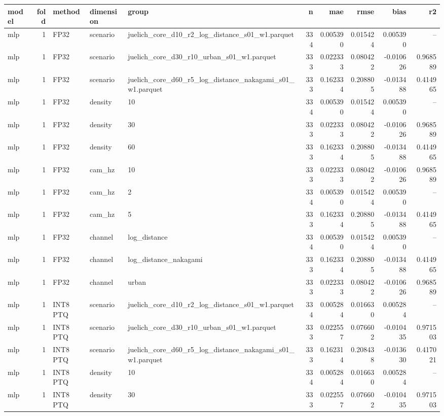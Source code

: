 \begin{tabular}{lrlllrrrrr}
\toprule
model & fold & method & dimension & group & n & mae & rmse & bias & r2 \\
\midrule
mlp & 1 & FP32 & scenario & juelich\_core\_d10\_r2\_log\_distance\_s01\_w1.parquet & 334 & 0.005390 & 0.015424 & 0.005390 & -- \\
mlp & 1 & FP32 & scenario & juelich\_core\_d30\_r10\_urban\_s01\_w1.parquet & 333 & 0.022333 & 0.080422 & -0.010626 & 0.968589 \\
mlp & 1 & FP32 & scenario & juelich\_core\_d60\_r5\_log\_distance\_nakagami\_s01\_w1.parquet & 333 & 0.162334 & 0.208805 & -0.013488 & 0.414965 \\
mlp & 1 & FP32 & density & 10 & 334 & 0.005390 & 0.015424 & 0.005390 & -- \\
mlp & 1 & FP32 & density & 30 & 333 & 0.022333 & 0.080422 & -0.010626 & 0.968589 \\
mlp & 1 & FP32 & density & 60 & 333 & 0.162334 & 0.208805 & -0.013488 & 0.414965 \\
mlp & 1 & FP32 & cam\_hz & 10 & 333 & 0.022333 & 0.080422 & -0.010626 & 0.968589 \\
mlp & 1 & FP32 & cam\_hz & 2 & 334 & 0.005390 & 0.015424 & 0.005390 & -- \\
mlp & 1 & FP32 & cam\_hz & 5 & 333 & 0.162334 & 0.208805 & -0.013488 & 0.414965 \\
mlp & 1 & FP32 & channel & log\_distance & 334 & 0.005390 & 0.015424 & 0.005390 & -- \\
mlp & 1 & FP32 & channel & log\_distance\_nakagami & 333 & 0.162334 & 0.208805 & -0.013488 & 0.414965 \\
mlp & 1 & FP32 & channel & urban & 333 & 0.022333 & 0.080422 & -0.010626 & 0.968589 \\
mlp & 1 & INT8 PTQ & scenario & juelich\_core\_d10\_r2\_log\_distance\_s01\_w1.parquet & 334 & 0.005284 & 0.016630 & 0.005284 & -- \\
mlp & 1 & INT8 PTQ & scenario & juelich\_core\_d30\_r10\_urban\_s01\_w1.parquet & 333 & 0.022557 & 0.076602 & -0.010435 & 0.971503 \\
mlp & 1 & INT8 PTQ & scenario & juelich\_core\_d60\_r5\_log\_distance\_nakagami\_s01\_w1.parquet & 333 & 0.162314 & 0.208438 & -0.013630 & 0.417021 \\
mlp & 1 & INT8 PTQ & density & 10 & 334 & 0.005284 & 0.016630 & 0.005284 & -- \\
mlp & 1 & INT8 PTQ & density & 30 & 333 & 0.022557 & 0.076602 & -0.010435 & 0.971503 \\

\end{tabular}
